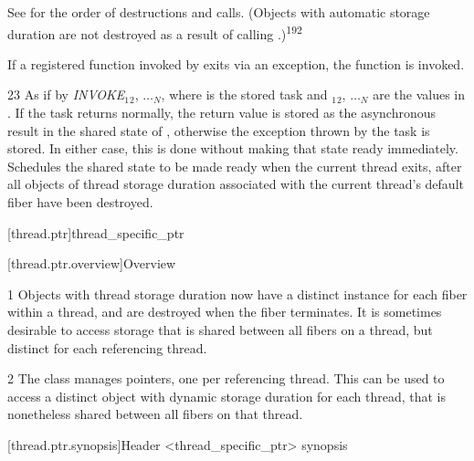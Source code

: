 \documentclass[fontsize=10pt,paper=A4,pagesize,DIV=15]{scrartcl}
\begin{document}
See  for the order of destructions and calls.
(Objects with automatic storage duration are not destroyed as a result of calling
.)\textsuperscript{192}

If a registered function invoked by  exits via an exception,
the function  is invoked.


23 \effects
As if by \emph{INVOKE}$_1$$_2$, $\dotsc$$_N$\cpp{)},
where  is the stored task and
$_1$$_2$, $\dotsc$$_N$ are the values in . If the task returns normally,
the return value is stored as the asynchronous result in the shared state of
, otherwise the exception thrown by the task is stored. In either
case, this is done without making that state ready immediately. Schedules
the shared state to be made ready when the current thread exits,
after all objects of thread storage duration associated with the current 
{thread's default fiber} have been destroyed.


\cbstart

[thread.ptr]{thread\_specific\_ptr}

[thread.ptr.overview]{Overview}

1 Objects with thread storage duration now have a distinct instance for each
fiber within a thread, and are destroyed when the fiber terminates. It is
sometimes desirable to access storage that is shared between all fibers on a
thread, but distinct for each referencing thread.

2 The \tptr class manages pointers, one per referencing thread. This can be
used to access a distinct object with dynamic storage duration for each
thread, that is nonetheless shared between all fibers on that thread.

[thread.ptr.synopsis]{Header <thread\_specific\_ptr> synopsis}


\end{document}
